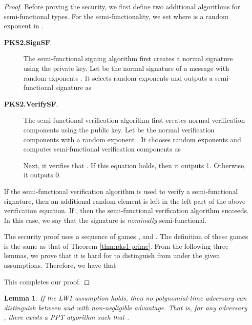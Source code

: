 \documentclass[11pt,letterpaper]{article}
\newtheorem{lemma}[theorem]{Lemma}
\newcommand{\tb}[1]{\textbf{#1}}
\begin{document}
\begin{proof}
Before proving the security, we first define two additional algorithms for
semi-functional types. For the semi-functionality, we set  where  is a random exponent in .

\begin{description}
\item [\tb{PKS2.SignSF}.] The semi-functional signing algorithm first
    creates a normal signature using the private key. Let  be the normal signature of a message  with random
    exponents . It selects random exponents  and outputs a semi-functional signature as
    

\item [\tb{PKS2.VerifySF}.] The semi-functional verification algorithm
    first creates normal verification components using the public key. Let
     be the normal verification components
    with a random exponent . It chooses random exponents  and computes semi-functional verification components as
    
    Next, it verifies that . If
    this equation holds, then it outputs 1. Otherwise, it outputs 0.
\end{description}
If the semi-functional verification algorithm is used to verify a
semi-functional signature, then an additional random element  is left in the left part of the above
verification equation. If , then the semi-functional verification
algorithm succeeds. In this case, we say that the signature is
\textit{nominally} semi-functional.

The security proof uses a sequence of games ,
and . The definition of these games is the same as that of Theorem
\ref{thm:pks1-prime}.
From the following three lemmas, we prove that it is hard for  to
distinguish  from  under the given assumptions.
Therefore, we have that
    
This completes our proof.
\end{proof}

\begin{lemma} \label{lem:pks2-prime-1}
If the LW1 assumption holds, then no polynomial-time adversary can
distinguish between  and  with non-negligible advantage.
That is, for any adversary , there exists a PPT algorithm 
such that
    .
\end{lemma}
\end{document}
